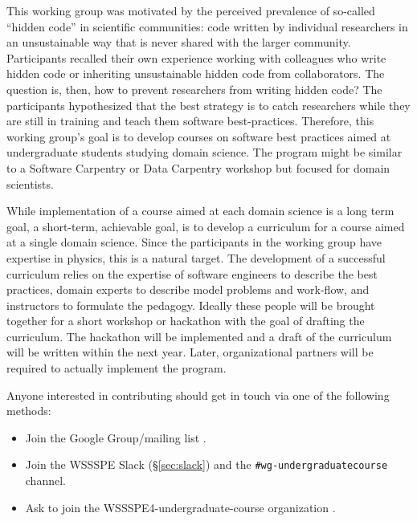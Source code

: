 \documentclass[11pt, oneside]{amsart}
\newcommand{\note}[1]{ {\textcolor{blueish}    { ***Note:      #1 }}}
\begin{document}

This working group was motivated by the perceived prevalence of
so-called ``hidden code'' in scientific communities: code written by
individual researchers in an unsustainable way that is never shared
with the larger community. Participants recalled their own experience
working with colleagues who write hidden code or inheriting
unsustainable hidden code from collaborators.
%
The question is, then, how to prevent researchers from writing hidden
code? The participants hypothesized that the best strategy is to catch
researchers while they are still in training and teach them software
best-practices. Therefore, this working group's goal
is to develop courses on software best practices aimed at
undergraduate students studying domain science. The program might be
similar to a Software Carpentry or Data Carpentry workshop but
focused for domain scientists.

While implementation of a course aimed at each domain science is a long term
goal, a short-term, achievable goal, is to develop a
curriculum for a course aimed at a single domain science. Since the
participants in the working group have expertise in physics, this is a
natural target.
%
The development of a successful curriculum relies on the expertise of
software engineers to describe the best practices, domain experts to
describe model problems and work-flow, and instructors to formulate
the pedagogy. Ideally these people will be brought together for a
short workshop or hackathon with the goal of drafting the
curriculum. The
hackathon will be implemented and a draft of the curriculum will be
written within the next year.
Later, organizational partners will be required to
actually implement the program.


Anyone interested in contributing should get in touch via one of the
following methods:

\begin{itemize}
\item Join the Google Group/mailing list
  \cite{WSSSPEUndergradGoogleGroup}.
\item Join the WSSSPE Slack (\S\ref{sec:slack}) and the
  \texttt{\#wg-undergraduatecourse} channel.
\item Ask to join the WSSSPE4-undergraduate-course organization
  \cite{WSSSPEUndergradGithub}.
\end{itemize}



\end{document}
